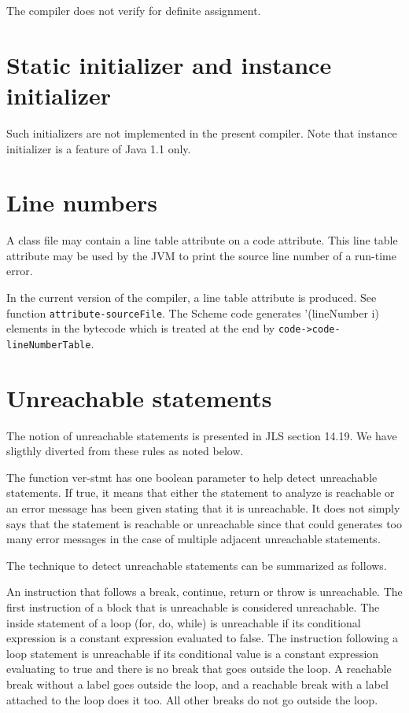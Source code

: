 \documentclass{book}
\newcommand{\func}[1]{\verb+#1+}
\begin{document}
The compiler does not verify for definite assignment. 

\section{Static initializer and instance initializer}

Such initializers are not implemented in the present compiler.
Note that instance initializer is a feature of Java 1.1 only.

\section{Line numbers}

A class file may contain a line table attribute on a code
attribute. This line table attribute may be used by the JVM to print
the source line number of a run-time error.

In the current version of the compiler, a line table attribute is
produced. See function \func{attribute-sourceFile}. The Scheme code
generates '(lineNumber i) elements in the bytecode which is treated at
the end by \func{code->code-lineNumberTable}.

\section{Unreachable statements}

The notion of unreachable statements is presented in JLS section
14.19. We have sligthly diverted from these rules as noted below.

The function ver-stmt has one boolean parameter to help detect
unreachable statements. If true, it means that either the statement to
analyze is reachable or an error message has been given stating that
it is unreachable. It does not simply says that the statement is
reachable or unreachable since that could generates too many error
messages in the case of multiple adjacent unreachable statements.

The technique to detect unreachable statements can be summarized as
follows.

An instruction that follows a break, continue, return or throw is
unreachable. The first instruction of a block that is unreachable is
considered unreachable. The inside statement of a loop (for, do,
while) is unreachable if its conditional expression is a constant
expression evaluated to false. The instruction following a loop
statement is unreachable if its conditional value is a constant
expression evaluating to true and there is no break that goes outside
the loop. A reachable break without a label goes outside the loop, and
a reachable break with a label attached to the loop does it too. All
other breaks do not go outside the loop.
\end{document}
